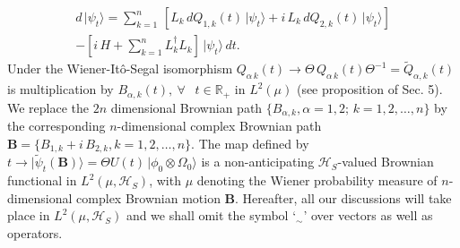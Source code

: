 \begin{multline}
d\,\vert\psi_t\rangle =\sum_{k=1}^{n}\, \left[L_k\,  dQ_{1,k}(t)\, \vert\psi_t\rangle 
+ i\,L_k\,  dQ_{2,k}(t)\, \vert\psi_t\rangle\right]\\  
-\left[i\, H+\sum_{k=1}^{n}L^\dag_k L_k \right] \, \vert\psi_t\rangle\, dt.\label{chap8-eq6.5}
\end{multline}  
Under the Wiener-It{\^o}-Segal isomorphism  $Q_{\alpha\,k}(t)\rightarrow \Theta\, Q_{\alpha\,k}(t)\Theta^{-1}=\widetilde{Q}_{\alpha,k}(t)$ is multiplication by  $B_{\alpha,k}(t),\ \forall \ \ \,\, t\in\mathbb{R}_+$ in  $L^2(\mu)$ (see proposition of Sec. 5). We replace  the $2n$ dimensional Brownian path $\{B_{\alpha,k}, \alpha=1,2;\, k=1,2,\ldots, n\}$  by the corresponding $n$-dimensional complex Brownian path $\mathbf{B}=\{B_{1,k}+i\,B_{2,k},k=1,2,\ldots , n\}.$ The map defined by  $t\rightarrow \vert\widetilde{\psi}_t(\mathbf{B})\rangle= \Theta U(t)\, \vert\phi_0\otimes \Omega_0\rangle$ is a non-anticipating $\mathcal{H}_S$-valued Brownian functional in $L^2(\mu, \mathcal{H}_S)$, with $\mu$ denoting the Wiener probability measure of $n$-dimensional complex Brownian motion $\mathbf{B}$. Hereafter, all our discussions will take place in $L^2(\mu, \mathcal{H}_S)$ and we shall omit the symbol `${}_{\sim}$' over vectors as well as operators.  

